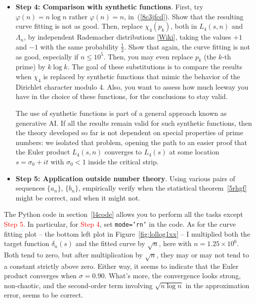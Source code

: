 \documentclass[oneside,10pt]{book}
\begin{document}
\begin{itemize}
\vspace{1ex}
\item[] {\bf Step 4: Comparison with synthetic functions}.  First, try $\varphi(n) = n\log n$ rather $\varphi(n) = n$, 
 in~(\ref{8c3jfcd}). Show that the resulting curve fitting is not as good. Then, replace $\chi_4(p_k)$, both
 in $L_4(s,n)$ and $\Lambda_n$, by independent  
\textcolor{index}{Rademacher distributions} 
 [\href{https://en.wikipedia.org/wiki/Rademacher_distribution}{Wiki}], taking the values $+1$ and $-1$ with the same probability $\frac{1}{2}$.
Show that again, the curve fitting is not as good, especially if $n\leq 10^5$. 
Then, you may even replace $p_k$ (the $k$-th prime) by $k\log k$.
The goal of  these substitutions is to compare the results
 when $\chi_4$ is replaced by \textcolor{index}{synthetic functions} that mimic the behavior of the  Dirichlet character modulo 4. Also, you want to assess how much leeway you have in the choice of these functions, for the conclusions to stay valid.
\vspace{1ex}

The use of synthetic functions is part of a general approach known as \textcolor{index}{generative AI}. If all
 the results remain valid for such synthetic functions, then the theory developed so far is not dependent on special properties of prime numbers: we isolated
 that problem, opening the path to an easier proof that the Euler product $L_4(s, n)$ converges to $L_4(s)$ at some location 
 $s = \sigma_0+ it$ with $\sigma_0 < 1$ inside the critical strip. 

\vspace{1ex}
\item[] {\bf Step 5: Application outside number theory}. Using various  pairs of sequences $\{a_n\}$, $\{b_n\}$, empirically verify when the statistical theorem~\ref{5rhgf} might be correct, and when it might not. 

\vspace{1ex}
\end{itemize}


\noindent The Python code in section~\ref{l4code} allows you to perform all the tasks except \textcolor{red}{Step 5}.
In particular, for \textcolor{red}{Step 4}, set \texttt{mode='rn'} in the code. As for the curve fitting plot -- the bottom left plot in
 Figure~\ref{fig:lollog1xx} -- I multiplied both the target function $\delta_n(s)$ and the fitted curve by $\sqrt{n}$, here with $n = 1.25 \times 10^6$.
 Both tend to zero, but after multiplication by $\sqrt{n}$, they may or may not tend to a constant strictly above zero. Either way,
 it seems to indicate that the Euler product converges when $\sigma = 0.90$. What's more, the convergence looks strong, non-chaotic,
 and the second-order term involving $\sqrt{n\log n}$ in the approximation error, seems to be correct.  
\end{document}
